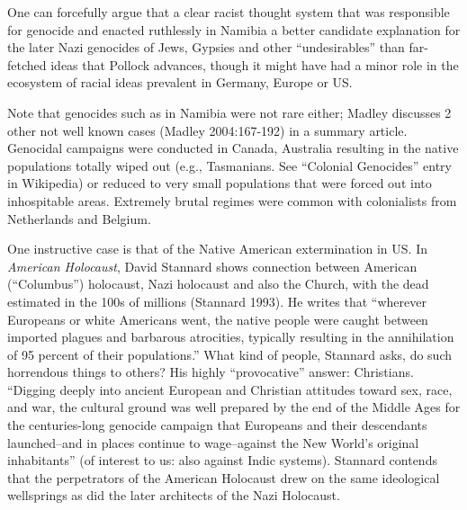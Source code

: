 One can forcefully argue that a clear racist thought system that was responsible for genocide and enacted ruthlessly in Namibia a better candidate explanation for the later Nazi genocides of  Jews, Gypsies and other “undesirables” than far-fetched ideas that Pollock advances, though it might have had a minor role in the ecosystem of racial ideas prevalent in Germany, Europe or US.

Note that genocides such as in Namibia were not rare either; Madley discusses 2 other not well known cases (Madley 2004:167-192) in a summary article. Genocidal campaigns were conducted in Canada, Australia resulting in the native populations totally wiped out (e.g., Tasmanians. See “Colonial Genocides” entry in Wikipedia) or reduced to very small populations that were forced out into inhospitable areas.  Extremely brutal regimes were common with colonialists from Netherlands and Belgium.

One instructive case is that of the Native American extermination in US\@.  In {\sl American Holocaust}, David Stannard shows connection between American (“Columbus”) holocaust, Nazi holocaust and also the Church, with the dead estimated in the 100s of millions (Stannard 1993). He writes that “wherever Europeans or white Americans went, the native people were caught between imported plagues and barbarous atrocities, typically resulting in the annihilation of 95 percent of their populations.” What kind of people, Stannard asks, do such horrendous things to others? His highly “provocative” answer: Christians. “Digging deeply into ancient European and Christian attitudes toward sex, race, and war, the cultural ground was well prepared by the end of the Middle Ages for the centuries-long genocide campaign that Europeans and their descendants launched--and in places continue to wage--against the New World's original inhabitants” (of interest to us: also against Indic systems). Stannard contends that the perpetrators of the American Holocaust drew on the same ideological wellsprings as did the later architects of the Nazi Holocaust.

